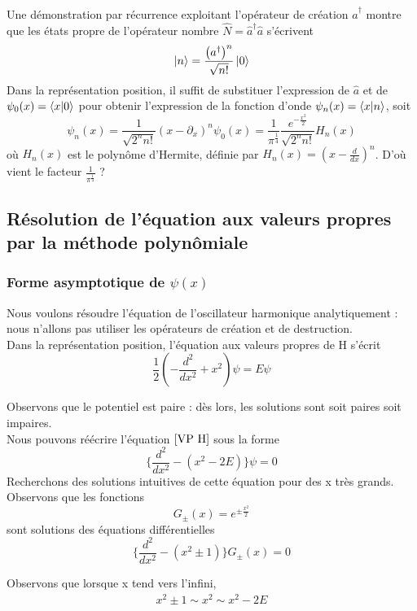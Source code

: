 \documentclass[../Notesdecours.tex]{subfiles}
\begin{document}
Une démonstration par récurrence exploitant l'opérateur de création $\hat{a}^\dagger$ montre que les états propre de l'opérateur nombre $\hat{N} = \hat{a}^\dagger\hat{a}$ s'écrivent
\begin{equation}
    \ket{n}=\frac{\left(a^\dagger\right)^n}{\sqrt{n!}}\ket{0}
\end{equation}
Dans la représentation position, il suffit de substituer l'expression de $\hat{a}$ et de $\psi_0 (x) = \braket{x|0}$ pour obtenir l'expression de la fonction d'onde $\psi_n (x) = \braket{x|n}$, soit
\begin{equation}
    \psi_n (x) = \frac{1}{\sqrt{2^n n!}}\left(x-\partial_x\right)^n\psi_0(x) = \frac{1}{\pi^{\frac{1}{4}}}\frac{e^{-\frac{x^2}{2}}}{\sqrt{2^nn!}}H_n(x)
\end{equation}
où $H_n(x)$ est le polynôme d'Hermite, définie par $H_n(x) = \left(x-\frac{d}{dx}\right)^n$. \color{red} D'où vient le facteur $\frac{1}{\pi^\frac{1}{4}}$ ? \color{black}

\subsection{Résolution de l'équation aux valeurs propres par la méthode polynômiale}
\subsubsection{Forme asymptotique de $\psi(x)$}

Nous voulons résoudre l'équation de l'oscillateur harmonique analytiquement : nous n'allons pas utiliser les opérateurs de création et de destruction.\\

Dans la représentation position, l'équation aux valeurs propres de H s'écrit 
\begin{equation}
    \label{VP H}
    \frac{1}{2}\left(-\frac{d^2}{dx^2}+x^2\right)\psi = E\psi 
\end{equation}

Observons que le potentiel est paire : dès lors, les solutions sont soit paires soit impaires.\\

Nous pouvons réécrire l'équation $\eqref{VP H}$ sous la forme
\begin{equation}
    \label{Equa etudiee}
    \big\{\frac{d^2}{dx^2}-\left(x^2-2E\right)\big\}\psi = 0
\end{equation}
Recherchons des solutions intuitives de cette équation pour des x très grands. Observons que les fonctions
\begin{equation}
    G_{\pm}(x) = e^{\pm \frac{x^2}{2}}
\end{equation}
sont solutions des équations différentielles
\begin{equation}
    \big\{\frac{d^2}{dx^2}-(x^2\pm 1)\big\}G_{\pm}(x) = 0
    \label{Equa grand x}
\end{equation}
\begin{remark}
    Observons que lorsque x tend vers l'infini,
    \begin{align*}
        x^2\pm 1 \sim x^2 \sim x^2-2E
    \end{align*}
\end{remark}
\end{document}
